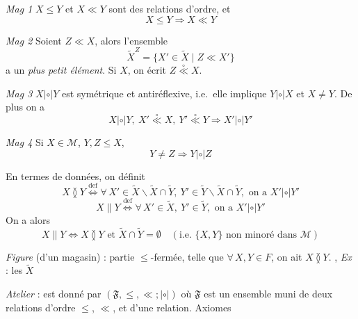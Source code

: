 \documentclass[11pt,a4paper]{article}
\begin{document}
\emph{Mag 1} $X \leq Y$ et $X \ll Y$ sont des relations d'ordre, et
\[
  X \leq Y \Longrightarrow X \ll Y
\]

\emph{Mag 2} Soient $Z \ll X$, alors l'ensemble
\[
  \widetilde{X}^{Z} = \lbrace X' \in \widetilde{X} \mid Z \ll X' \rbrace
\]
a un \emph{plus petit élément}. Si  $X$, on écrit $Z \mathrel{\overset{\circ}{\ll}} X$.

\emph{Mag 3} $X \mathrel{|{\circ}|} Y$ est symétrique et antiréflexive, i.e.\ elle implique $Y \mathrel{|{\circ}|} X$ et $X \neq Y$. De plus on a
\[
  X \mathrel{|{\circ}|} Y,\ X' \mathrel{\overset{\circ}{\ll}} X,\ Y' \mathrel{\overset{\circ}{\ll}} Y \Longrightarrow X' \mathrel{|{\circ}|} Y'
\]

\emph{Mag 4} Si $X \in \mathcal{M}$, $Y, Z \leq X$, \struck{\ill{}} 
\[
  Y \neq Z \Longrightarrow Y \mathrel{|{\circ}|} Z
\]

En termes de  données, on définit
\[
  X \between Y \overset{\mathrm{def}}{\Longleftrightarrow} \forall\, X' \in \widetilde{X} \smallsetminus \widetilde{X} \cap \widetilde{Y},\ Y' \in \widetilde{Y} \smallsetminus \widetilde{X} \cap \widetilde{Y}, \text{ on a } X' \mathrel{|{\circ}|} Y'
\]
\[
  X \parallel Y \overset{\mathrm{def}}{\Longleftrightarrow} \forall\, X' \in \widetilde{X},\ Y' \in \widetilde{Y}, \text{ on a } X' \mathrel{|{\circ}|} Y'
\]
On  a alors
\[
  X \parallel Y \Longleftrightarrow X \between Y \text{ et } \widetilde{X} \cap \widetilde{Y} = \emptyset \quad (\text{i.e.\ } \lbrace X, Y \rbrace \text{ non minoré dans } \mathcal{M})
\]

\struck{\ill{}} \emph{Figure}  (d'un magasin) : partie $\leq$-fermée, telle que $\forall\, X, Y \in F$, on ait $X \between Y$. \emph{}, \emph{Ex} : les $\widetilde{X}$

\emph{Atelier}  : est donné par $(\mathfrak{F}, \leq, \ll ; \mathrel{|{\circ}|})$ où $\mathfrak{F}$ est un ensemble muni de deux relations d'ordre $\leq$, $\ll$, et d'une \struck{\ill{} \ill{}} relation. \struck{\ill{}} Axiomes
\end{document}
